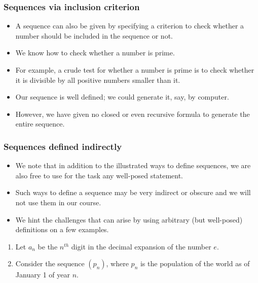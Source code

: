 \begin{frame}
\frametitle{Sequences via inclusion criterion}
\begin{itemize}
\item A sequence can also be given by specifying a criterion to check whether a number should be included in the sequence or not.

\item<3-> We know how to check whether a number is prime.
\item<4-> For example, a crude test for whether a number is prime is to check whether it is divisible by all positive numbers smaller than it.
\item<5-> Our sequence is well defined; we could generate it, say, by computer.
\item<6-> However, we have given no closed or even recursive formula to generate the entire sequence.
\end{itemize}
\end{frame}
\begin{frame}
\frametitle{Sequences defined indirectly}

\begin{itemize}
\item We note that in addition to the illustrated ways to define sequences, we are also free to use for the task any well-posed statement. 
\item<2-> Such ways to define a sequence may be very indirect or obscure and we will not use them in our course.
\item<3-> We hint the challenges that can arise by using arbitrary (but well-posed) definitions on a few examples.
\end{itemize}
\begin{example}
\begin{enumerate}
\item<4->  Let $a_n$ be the $n^{th}$ digit in the decimal expansion of the number $e$. %

\item<6-> Consider the sequence $( p_n)$, where $p_n$ is the population of the world as of January 1 of year $n$. 
\end{enumerate}
\end{example}
\end{frame}





